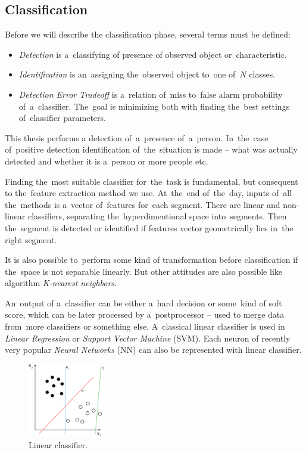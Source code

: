 \subsection*{Classification}
Before we will describe the classification phase, several terms must be defined: 
\begin{itemize}
\item {\it Detection} is a~classifying of presence of observed object or~characteristic.
\item {\it Identification} is an~assigning the~observed object to~one of~$N$ classes.
\item {\it Detection Error Tradeoff} is a~relation of~miss to~false alarm probability of~a~classifier.
The~goal is minimizing both with finding the~best settings of~classifier parameters.
\end{itemize}
This thesis performs a detection of~a~presence of~a~person. In~the~case of~positive detection identification
of~the~situation is made -- what was actually detected and whether it is a~person or more people etc.

Finding the~most suitable classifier for~the~task is fundamental, but consequent to the~feature extraction
method we use. At~the~end of~the~day, inputs of~all the~methods is a~vector of~features for~each segment.
There are linear and non-linear classifiers, separating the~hyperdimentional space into~segments. Then
the~segment is detected or identified if features vector geometrically lies in~the right segment. 

It is also possible to~perform some kind of transformation before classification if the~space is not separable
linearly. But other attitudes are also possible like algorithm {\it K-nearest neighbors}.

An~output of a~classifier can be either a~hard decision or some~kind of soft score, which can be later processed
by a~postprocessor -- used to merge data from~more classifiers or something else. A~classical linear classifier
is used in {\it Linear Regression} or {\it Support Vector Machine} (SVM). Each neuron of recently very popular
{\it Neural Networks} (NN) can also be represented with linear classifier.

\begin{figure}[h!]
\begin{center}
\includegraphics[width=0.3\textwidth]{obrazky-figures/linear.png}
\caption{Linear classifier.\cite{LinearClassifier}\label{fig:linearclassifier}}
\end{center}
\end{figure}

